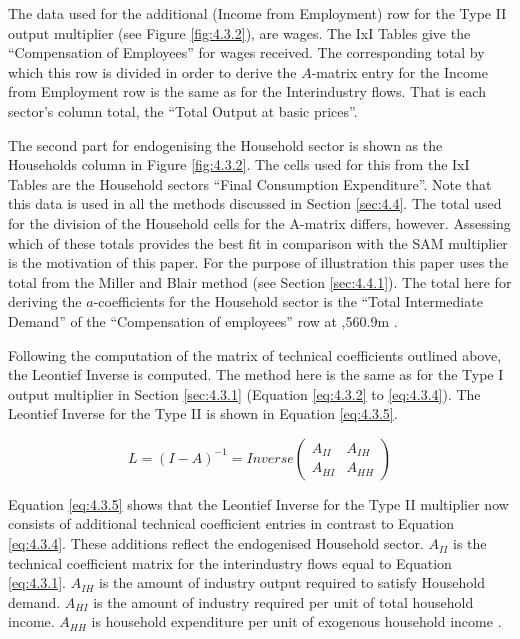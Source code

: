 \begin{doublespacing}
The data used for the additional (Income from Employment) row for the Type II output multiplier (see Figure \ref{fig:4.3.2}), are wages. The IxI Tables give the ``Compensation of Employees'' for wages received. The corresponding total by which this row is divided in order to derive the $\textit{A}$-matrix entry for the Income from Employment row is the same as for the Interindustry flows. That is each sector's column total, the ``Total Output at basic prices''.

\bigskip

The second part for endogenising the Household sector is shown as the Households column in  Figure \ref{fig:4.3.2}. The cells used for this from the IxI Tables are the Household sectors ``Final Consumption Expenditure''. Note that this data is used in all the methods discussed in  Section \ref{sec:4.4}. The total used for the division of the Household cells for the A-matrix differs, however. Assessing which of these totals provides the best fit in comparison with the SAM multiplier is the motivation of this paper. For the purpose of illustration this paper uses the total from the Miller and Blair  method (see Section \ref{sec:4.4.1}). The total here for deriving the $a$-coefficients for the Household sector is the  ``Total Intermediate Demand'' of the ``Compensation of employees'' row at ,560.9m \cite{ScottishGovernment2013a}.

\bigskip

Following the computation of the matrix of technical coefficients outlined above, the Leontief Inverse is computed. The method here is the same as for the Type I output multiplier in Section \ref{sec:4.3.1} (Equation \ref{eq:4.3.2} to \ref{eq:4.3.4}). The Leontief Inverse for the Type II is shown in Equation \ref{eq:4.3.5}.

  \bigskip  \begin{singlespacing}  \begin{equation} \label{eq:4.3.5}
  L=(I-A)^{-1} = Inverse   \begin{pmatrix}
  A_{II} &  A_{IH} \\
  A_{HI}  & A_{HH}
  \end{pmatrix} 
  \end{equation}   \end{singlespacing}  \bigskip

Equation \ref{eq:4.3.5} shows that the Leontief Inverse for the Type II multiplier now consists of additional technical coefficient entries in contrast to Equation \ref{eq:4.3.4}. These additions reflect the endogenised Household sector. $A_{II}$ is the technical coefficient matrix for the interindustry flows equal to Equation \ref{eq:4.3.1}. $A_{IH}$ is the amount of industry output required to satisfy Household demand. $A_{HI}$ is the amount of industry required per unit of total household income. $A_{HH}$ is household expenditure per unit of exogenous household income \cite{ScottishGovernment2013a}.


\end{doublespacing}
